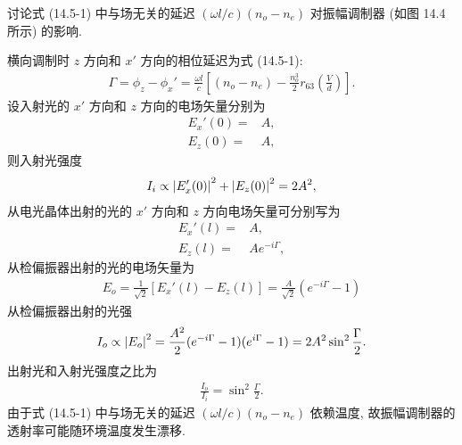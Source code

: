 \documentclass[twoside]{note}
\begin{document}
\begin{exe}
    讨论式 (14.5-1) 中与场无关的延迟 $(\omega l/c)(n_o-n_e)$ 对振幅调制器 (如图 14.4 所示) 的影响.
\end{exe}
\begin{sol}
    横向调制时 $z$ 方向和 $x'$ 方向的相位延迟为式 (14.5-1):
    \begin{align}
        \Gamma=\phi_z-\phi_x'=\frac{\omega l}{c}\left[(n_o-n_e)-\frac{n_o^3}{2}r_{63}\left(\frac{V}{d}\right)\right].
    \end{align}
    设入射光的 $x'$ 方向和 $z$ 方向的电场矢量分别为
    \begin{align}
        E_x'(0)=&A,\\
        E_z(0)=&A,
    \end{align}
    则入射光强度
    \begin{align}
        I_i\propto\left\lvert E_x'(0)\right\rvert^2+\left\lvert E_z(0)\right\rvert^2=2A^2,
    \end{align}
    从电光晶体出射的光的 $x'$ 方向和 $z$ 方向电场矢量可分别写为
    \begin{align}
        E_x'(l)=&A,\\
        E_z(l)=&Ae^{-i\Gamma},
    \end{align}
    从检偏振器出射的光的电场矢量为
    \begin{align}
        E_o=\frac{1}{\sqrt{2}}[E_x'(l)-E_z(l)]=\frac{A}{\sqrt{2}}(e^{-i\Gamma}-1)
    \end{align}
    从检偏振器出射的光强
    \begin{align}
        I_o\propto\left\lvert E_o\right\rvert^2=\frac{A^2}{2}(e^{-i\Gamma}-1)(e^{i\Gamma}-1)=2A^2\sin^2\frac{\Gamma}{2}.
    \end{align}
    出射光和入射光强度之比为
    \begin{align}
        \frac{I_o}{I_i}=\sin^2\frac{\Gamma}{2}.
    \end{align}
    由于式 (14.5-1) 中与场无关的延迟 $(\omega l/c)(n_o-n_e)$ 依赖温度, 故振幅调制器的透射率可能随环境温度发生漂移.
\end{sol}
\end{document}
